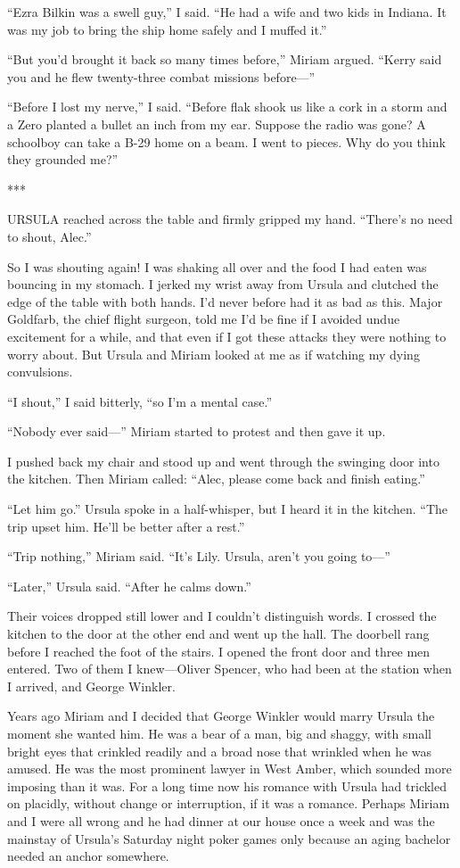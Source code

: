 \documentclass{novel}
\begin{document}
“Ezra Bilkin was a swell guy,” I said. “He had a wife and two kids in Indiana. It was my job to bring the ship home safely and I muffed it.”

“But you’d brought it back so many times before,” Miriam argued. “Kerry said you and he flew twenty-three combat missions before—”

“Before I lost my nerve,” I said. “Before flak shook us like a cork in a storm and a Zero planted a bullet an inch from my ear. Suppose the radio was gone? A schoolboy can take a B-29 home on a beam. I went to pieces. Why do you think they grounded me?”

***

URSULA reached across the table and firmly gripped my hand. “There’s no need to shout, Alec.”

So I was shouting again! I was shaking all over and the food I had eaten was bouncing in my stomach. I jerked my wrist away from Ursula and clutched the edge of the table with both hands. I’d never before had it as bad as this. Major Goldfarb, the chief flight surgeon, told me I’d be fine if I avoided undue excitement for a while, and that even if I got these attacks they were nothing to worry about. But Ursula and Miriam looked at me as if watching my dying convulsions.

“I shout,” I said bitterly, “so I’m a mental case.”

“Nobody ever said—” Miriam started to protest and then gave it up.

I pushed back my chair and stood up and went through the swinging door into the kitchen. Then Miriam called: “Alec, please come back and finish eating.”

“Let him go.” Ursula spoke in a half-whisper, but I heard it in the kitchen. “The trip upset him. He’ll be better after a rest.”

“Trip nothing,” Miriam said. “It’s Lily. Ursula, aren’t you going to—”

“Later,” Ursula said. “After he calms down.”

Their voices dropped still lower and I couldn’t distinguish words. I crossed the kitchen to the door at the other end and went up the hall. The doorbell rang before I reached the foot of the stairs. I opened the front door and three men entered. Two of them I knew—Oliver Spencer, who had been at the station when I arrived, and George Winkler.

Years ago Miriam and I decided that George Winkler would marry Ursula the moment she wanted him. He was a bear of a man, big and shaggy, with small bright eyes that crinkled readily and a broad nose that wrinkled when he was amused. He was the most prominent lawyer in West Amber, which sounded more imposing than it was. For a long time now his romance with Ursula had trickled on placidly, without change or interruption, if it was a romance. Perhaps Miriam and I were all wrong and he had dinner at our house once a week and was the mainstay of Ursula’s Saturday night poker games only because an aging bachelor needed an anchor somewhere.
\end{document}
